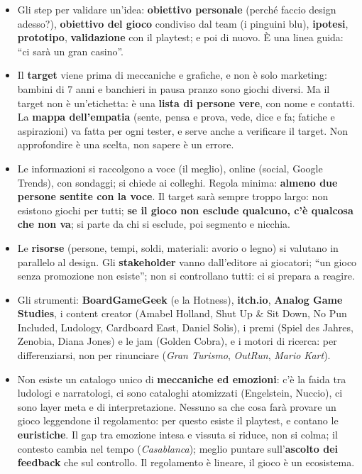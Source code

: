 \begin{itemize}
        \emph{Scrabble} più \emph{Dominion} uguale \emph{Paperback}), anche
        crossmediale. Siatene consapevoli. Le meccaniche non sono tutelabili, nomi,
        loghi e aspetto sì (il caso \emph{Bang!} e \emph{Samurai Sword}); niente
        proprietà intellettuali altrui; \textbf{dichiarate le ispirazioni}.
  \item Gli step per validare un'idea: \textbf{obiettivo personale} (perché faccio
        design adesso?), \textbf{obiettivo del gioco} condiviso dal team (i pinguini
        blu), \textbf{ipotesi}, \textbf{prototipo}, \textbf{validazione} con il
        playtest; e poi di nuovo. È una linea guida: ``ci sarà un gran casino''.
  \item Il \textbf{target} viene prima di meccaniche e grafiche, e non è solo
        marketing: bambini di 7 anni e banchieri in pausa pranzo sono giochi diversi.
        Ma il target non è un'etichetta: è una \textbf{lista di persone vere}, con nome
        e contatti. La \textbf{mappa dell'empatia} (sente, pensa e prova, vede, dice e
        fa; fatiche e aspirazioni) va fatta per ogni tester, e serve anche a
        verificare il target. Non approfondire è una scelta, non sapere è un errore.
  \item Le informazioni si raccolgono a voce (il meglio), online (social, Google
        Trends), con sondaggi; si chiede ai colleghi. Regola minima: \textbf{almeno due
        persone sentite con la voce}. Il target sarà sempre troppo largo: non esistono
        giochi per tutti; \textbf{se il gioco non esclude qualcuno, c'è qualcosa che
        non va}; si parte da chi si esclude, poi segmento e nicchia.
  \item Le \textbf{risorse} (persone, tempi, soldi, materiali: avorio o legno) si
        valutano in parallelo al design. Gli \textbf{stakeholder} vanno dall'editore
        ai giocatori; ``un gioco senza promozione non esiste''; non si controllano
        tutti: ci si prepara a reagire.
  \item Gli strumenti: \textbf{BoardGameGeek} (e la Hotness), \textbf{itch.io},
        \textbf{Analog Game Studies}, i content creator (Amabel Holland, Shut Up \&
        Sit Down, No Pun Included, Ludology, Cardboard East, Daniel Solis), i premi
        (Spiel des Jahres, Zenobia, Diana Jones) e le jam (Golden Cobra), e i motori di
        ricerca: per differenziarsi, non per rinunciare (\emph{Gran Turismo},
        \emph{OutRun}, \emph{Mario Kart}).
  \item Non esiste un catalogo unico di \textbf{meccaniche ed emozioni}: c'è la faida
        tra ludologi e narratologi, ci sono cataloghi atomizzati (Engelstein, Nuccio),
        ci sono layer meta e di interpretazione. Nessuno sa che cosa farà provare un
        gioco leggendone il regolamento: per questo esiste il playtest, e contano le
        \textbf{euristiche}. Il gap tra emozione intesa e vissuta si riduce, non si
        colma; il contesto cambia nel tempo (\emph{Casablanca}); meglio puntare
        sull'\textbf{ascolto dei feedback} che sul controllo. Il regolamento è lineare,
        il gioco è un ecosistema.
\end{itemize}
